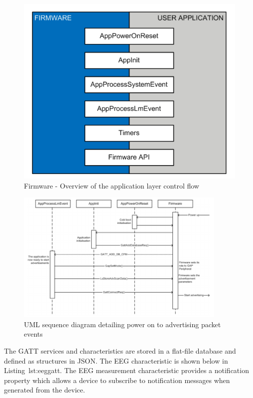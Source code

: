 \documentclass[]{article}
\begin{document}
\begin{figure}[htb]
	\begin{center}
		\includegraphics{flow}
	\end{center}
	\caption{Firmware - Overview of the application layer control flow \cite{firmwaredev}}
	\label{fig:flow}
\end{figure}


\begin{figure}[htb]
	\begin{center}
		\includegraphics[width = 0.9\textwidth]{uml}
	\end{center}
	\caption{UML sequence diagram detailing power on to advertising packet events \cite{firmwaredev}}
	\label{fig:umlseq}
\end{figure}


The \ac{GATT} services and characteristics are stored in a flat-file database and defined as structures in JSON. The EEG characteristic is shown below in Listing~{lst:eeggatt}. The EEG measurement characteristic provides a notification property which allows a device to subscribe to notification messages when generated from the device.
\end{document}
